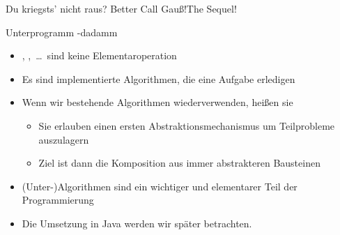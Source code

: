 {{\begin{frame}[c]{Du kriegsts' nicht raus? Better Call Gauß!\hfill The Sequel!}
\end{frame}
}}

\iffull
{\AddonFrame
\begin{frame}{Unterprogramm -dadamm}
    \begin{itemize}[<+(1)->]
        \itemsep15pt
        \item {}, ,~\ldots\ sind keine Elementaroperation
        \item Es sind implementierte Algorithmen, die eine Aufgabe erledigen
        \item Wenn wir bestehende Algorithmen wiederverwenden, heißen sie  \begin{itemize}
            \item Sie erlauben einen ersten Abstraktionsmechanismus um Teilprobleme auszulagern
            \item Ziel ist dann die Komposition aus immer abstrakteren Bausteinen
        \end{itemize}
        \item (Unter-)Algorithmen sind ein wichtiger und elementarer Teil der Programmierung
        \item Die Umsetzung in Java werden wir später betrachten.
    \end{itemize}
\end{frame}
}
\fi

